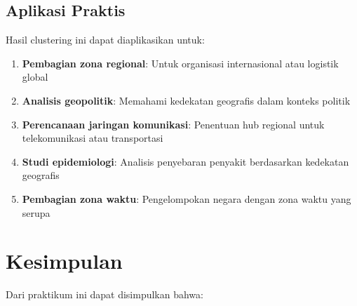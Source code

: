 \documentclass[12pt,a4paper]{article}
\begin{document}
\subsection{Aplikasi Praktis}

Hasil clustering ini dapat diaplikasikan untuk:
\begin{enumerate}
    \item \textbf{Pembagian zona regional}: Untuk organisasi internasional atau logistik global
    \item \textbf{Analisis geopolitik}: Memahami kedekatan geografis dalam konteks politik
    \item \textbf{Perencanaan jaringan komunikasi}: Penentuan hub regional untuk telekomunikasi atau transportasi
    \item \textbf{Studi epidemiologi}: Analisis penyebaran penyakit berdasarkan kedekatan geografis
    \item \textbf{Pembagian zona waktu}: Pengelompokan negara dengan zona waktu yang serupa
\end{enumerate}

\newpage
\section{Kesimpulan}

Dari praktikum ini dapat disimpulkan bahwa:
\end{document}
